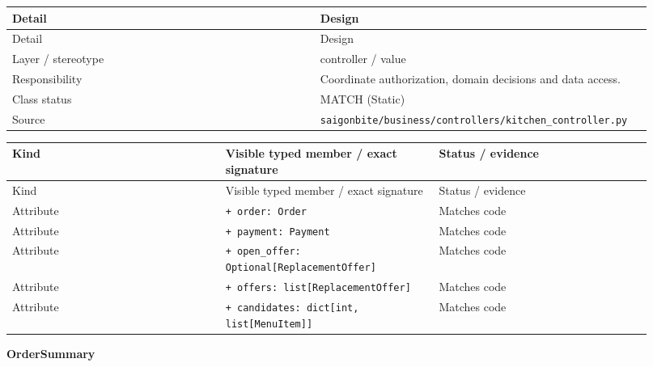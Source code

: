 \begin{longtable}{>{\raggedright\arraybackslash}p{0.4600\linewidth}>{\raggedright\arraybackslash}p{0.4600\linewidth}}
Detail & Design \\
\hline\endfirsthead
Detail & Design \\
\hline\endhead
Layer / stereotype & controller / \guillemotleft{}value\guillemotright{} \\
Responsibility & Coordinate authorization, domain decisions and data access. \\
Class status & MATCH (Static) \\
Source & \texttt{saigonbite/\allowbreak{}business/\allowbreak{}controllers/\allowbreak{}kitchen\_\allowbreak{}controller.\allowbreak{}py} \\
\end{longtable}
\begin{longtable}{>{\raggedright\arraybackslash}p{0.3067\linewidth}>{\raggedright\arraybackslash}p{0.3067\linewidth}>{\raggedright\arraybackslash}p{0.3067\linewidth}}
Kind & Visible typed member / exact signature & Status / evidence \\
\hline\endfirsthead
Kind & Visible typed member / exact signature & Status / evidence \\
\hline\endhead
Attribute & \texttt{+ order: Order} & Matches code \\
Attribute & \texttt{+ payment: Payment} & Matches code \\
Attribute & \texttt{+ open\_\allowbreak{}offer: Optional[ReplacementOffer]} & Matches code \\
Attribute & \texttt{+ offers: list[ReplacementOffer]} & Matches code \\
Attribute & \texttt{+ candidates: dict[int, list[MenuItem]]} & Matches code \\
\end{longtable}
\textbf{OrderSummary}

